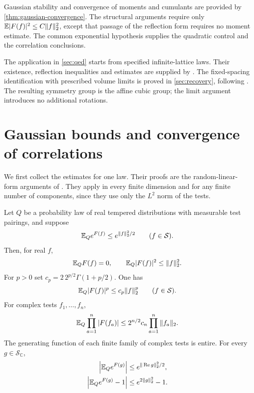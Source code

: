 \documentclass[11pt,letterpaper,reqno]{amsart}
\begin{document}
Gaussian stability and convergence of moments and cumulants are
provided by \cref{thm:gaussian-convergence}.
The structural arguments require only
\(\mathbb E|F(f)|^2\le C\|f\|_2^2\), except that passage of the reflection
form requires no moment estimate. The common exponential hypothesis
supplies the quadratic control and the correlation conclusions.

The application in \cref{sec:qed} starts from specified
infinite-lattice laws. Their existence, reflection inequalities
and estimates are supplied by \cite[Theorem~A]{ChamberLattice}.
The fixed-spacing identification with prescribed volume limits is
proved in \cref{sec:recovery}, following
\cite[Section~6.4]{QED3Manuscript}.
The resulting symmetry group is the affine cubic group; the limit
argument introduces no additional rotations.


\section{Gaussian bounds and convergence of correlations}\label{sec:gaussian}
We first collect the estimates for one law. Their proofs are
the random-linear-form arguments of
\cite[Proposition~5.1 and Section~5.2]{QED3Manuscript}.
They apply in every finite dimension and for any finite number
of components, since they use only the $L^2$ norm of the tests.

\begin{proposition}\label{prop:subgaussian}
Let $Q$ be a probability law of real tempered distributions
with measurable test pairings, and suppose
\begin{equation}\label{eq:probability-G}
 \mathbb E_Q e^{F(f)}\le e^{\|f\|_2^2/2}\qquad(f\in\mathcal S).
\end{equation}
Then, for real $f$,
\begin{equation}\label{eq:field-variance}
 \mathbb E_Q F(f)=0,\qquad \mathbb E_Q|F(f)|^2\le\|f\|_2^2.
\end{equation}
For $p>0$ set $c_p=2\,2^{p/2}\Gamma(1+p/2)$. One has
\[
 \mathbb E_Q|F(f)|^p\le c_p\|f\|_2^p\qquad(f\in\mathcal S).
\]
For complex tests $f_1,\ldots,f_n$,
\begin{equation}\label{eq:joint-moment-bound}
 \mathbb E_Q\prod_{a=1}^n|F(f_a)|
       \le 2^{n/2}c_n\prod_{a=1}^n\|f_a\|_2.
\end{equation}
The generating function of each finite family of complex tests
is entire. For every $g\in\mathcal S_{\mathbb C}$,
\begin{align}
 \left|\mathbb E_Q e^{F(g)}\right|
       &\le e^{\|\operatorname{Re}g\|_2^2/2},
                      \label{eq:entire-generating-bound}\\
 \left|\mathbb E_Q e^{F(g)}-1\right|
       &\le e^{2\|g\|_2^2}-1. \label{eq:zero-free-bound}
\end{align}
\end{proposition}
\end{document}
